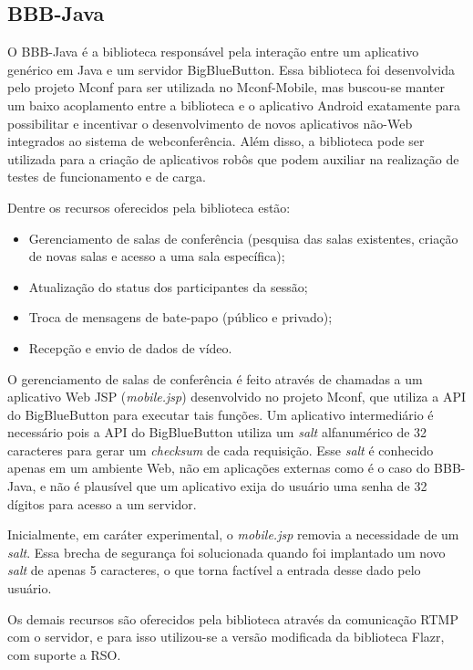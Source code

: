 \documentclass{acm_proc_article-sp}
\begin{document}
\subsection{BBB-Java}

O BBB-Java é a biblioteca responsável pela interação entre um aplicativo genérico em Java e um servidor BigBlueButton. Essa biblioteca foi desenvolvida pelo projeto Mconf para ser utilizada no Mconf-Mobile, mas buscou-se manter um baixo acoplamento entre a biblioteca e o aplicativo Android exatamente para possibilitar e incentivar o desenvolvimento de novos aplicativos não-Web integrados ao sistema de webconferência. Além disso, a biblioteca pode ser utilizada para a criação de aplicativos robôs que podem auxiliar na realização de testes de funcionamento e de carga.

Dentre os recursos oferecidos pela biblioteca estão:
\begin{itemize}
 \item Gerenciamento de salas de conferência (pesquisa das salas existentes, criação de novas salas e acesso a uma sala específica);
 \item Atualização do status dos participantes da sessão;
 \item Troca de mensagens de bate-papo (público e privado);
 \item Recepção e envio de dados de vídeo.
\end{itemize}

O gerenciamento de salas de conferência é feito através de chamadas a um aplicativo Web JSP (\emph{mobile.jsp}) desenvolvido no projeto Mconf, que utiliza a API do BigBlueButton para executar tais funções. Um aplicativo intermediário é necessário pois a API do BigBlueButton utiliza um \emph{salt} alfanumérico de 32 caracteres para gerar um \emph{checksum} de cada requisição. Esse \emph{salt} é conhecido apenas em um ambiente Web, não em aplicações externas como é o caso do BBB-Java, e não é plausível que um aplicativo exija do usuário uma senha de 32 dígitos para acesso a um servidor.

Inicialmente, em caráter experimental, o \emph{mobile.jsp} removia a necessidade de um \emph{salt}. Essa brecha de segurança foi solucionada quando foi implantado um novo \emph{salt} de apenas 5 caracteres, o que torna factível a entrada desse dado pelo usuário.

Os demais recursos são oferecidos pela biblioteca através da comunicação RTMP com o servidor, e para isso utilizou-se a versão modificada da biblioteca Flazr, com suporte a RSO.
\end{document}
